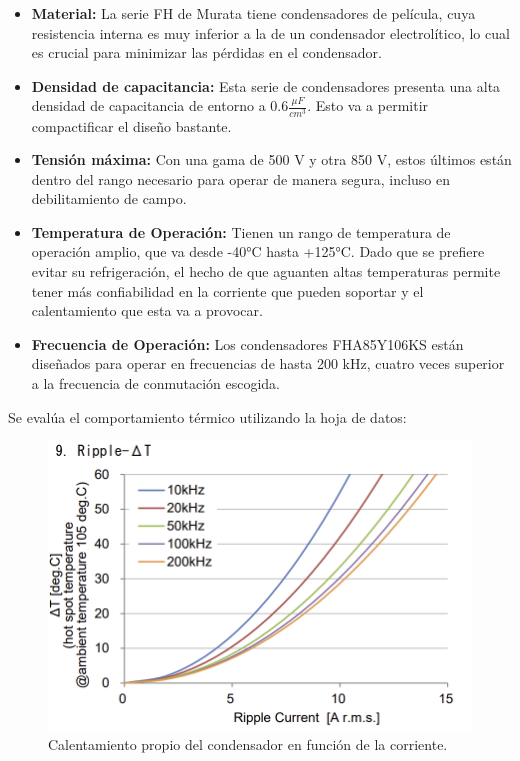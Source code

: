 \begin{itemize}
	\item \textbf{Material:} La serie FH de Murata tiene condensadores de película, cuya resistencia interna es muy inferior a la de un condensador electrolítico, lo cual es crucial para minimizar las pérdidas en el condensador.
	
	\item \textbf{Densidad de capacitancia:} Esta serie de condensadores presenta una alta densidad de capacitancia de entorno a $0.6\frac{\mu F}{cm^3}$. Esto va a permitir compactificar el diseño bastante.
	
	\item \textbf{Tensión máxima:} Con una gama de 500 V y otra 850 V, estos últimos están dentro del rango necesario para operar de manera segura, incluso en debilitamiento de campo.
	
	\item \textbf{Temperatura de Operación:} Tienen un rango de temperatura de operación amplio, que va desde -40°C hasta +125°C. Dado que se prefiere evitar su refrigeración, el hecho de que aguanten altas temperaturas permite tener más confiabilidad en la corriente que pueden soportar y el calentamiento que esta va a provocar.
	
	\item \textbf{Frecuencia de Operación:} Los condensadores FHA85Y106KS están diseñados para operar en frecuencias de hasta 200 kHz, cuatro veces superior a la frecuencia de conmutación escogida.
	
	
\end{itemize}

Se evalúa el comportamiento térmico utilizando la hoja de datos:
\begin{figure}[H]
	\centering
	\includegraphics[width=0.7\linewidth]{fig/dc-link-temp}
	\caption{Calentamiento propio del condensador en función de la corriente.}
\end{figure}

